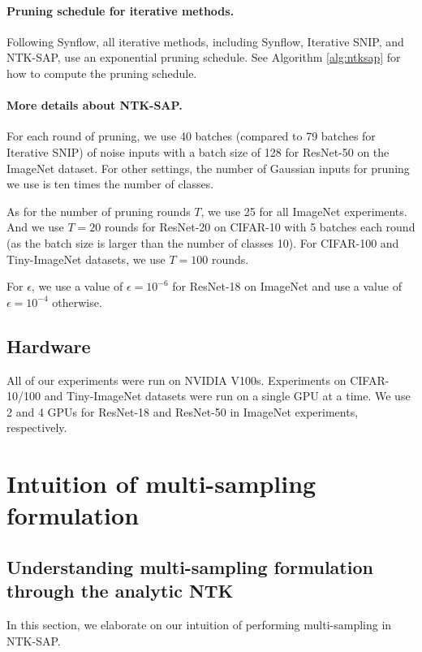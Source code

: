 \documentclass{article} %
\begin{document}
\paragraph{Pruning schedule for iterative methods.} Following Synflow, all iterative methods, including Synflow, Iterative SNIP, and NTK-SAP, use an exponential pruning schedule. See Algorithm \ref{alg:ntksap} for how to compute the pruning schedule.

\paragraph{More details about NTK-SAP.} For each round of pruning, we use 40 batches (compared to 79 batches for Iterative SNIP) of noise inputs with a batch size of 128 for ResNet-50 on the ImageNet dataset. For other settings, the number of Gaussian inputs for pruning we use is ten times the number of classes. 

As for the number of pruning rounds $T$, we use 25 for all ImageNet experiments. And we use $T=20$ rounds for ResNet-20 on CIFAR-10 with 5 batches each round (as the batch size is larger than the number of classes 10). For CIFAR-100 and Tiny-ImageNet datasets, we use $T=100$ rounds. 

For $\epsilon$, we use a value of $\epsilon={10}^{-6}$ for ResNet-18 on ImageNet and use a value of $\epsilon={10}^{-4}$ otherwise.

\subsection{Hardware} \label{sect:appendix-hardware} All of our experiments were run on NVIDIA V100s. Experiments on CIFAR-10/100 and Tiny-ImageNet datasets were run on a single GPU at a time. We use 2 and 4 GPUs for ResNet-18 and ResNet-50 in ImageNet experiments, respectively.

\section{Intuition of multi-sampling formulation} \label{sect:appendix-intuition}

\subsection{Understanding multi-sampling formulation through the analytic NTK}
\label{sect:appendix-B1}

In this section, we elaborate on our intuition of performing multi-sampling in NTK-SAP.
\end{document}
